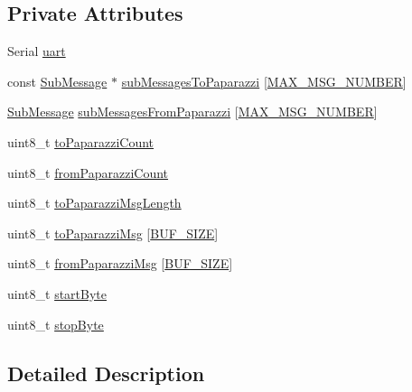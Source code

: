 \subsection*{Private Attributes}
\begin{DoxyCompactItemize}
\item 
Serial \hyperlink{class_u_a_r_t_messenger_aabc5283b509be4ce8335bbb2513e9b4c}{uart}
\item 
const \hyperlink{struct_sub_message}{Sub\+Message} $\ast$ \hyperlink{class_u_a_r_t_messenger_a1caaef4e6d8fa5005cd8ea5ff4937369}{sub\+Messages\+To\+Paparazzi} \mbox{[}\hyperlink{_u_a_r_t_messenger_8h_a6274d6c4801975be4baacd279386909d}{M\+A\+X\+\_\+\+M\+S\+G\+\_\+\+N\+U\+M\+B\+ER}\mbox{]}
\item 
\hyperlink{struct_sub_message}{Sub\+Message} \hyperlink{class_u_a_r_t_messenger_ad6fb0fea8b0262d46cc97f5d5b262a51}{sub\+Messages\+From\+Paparazzi} \mbox{[}\hyperlink{_u_a_r_t_messenger_8h_a6274d6c4801975be4baacd279386909d}{M\+A\+X\+\_\+\+M\+S\+G\+\_\+\+N\+U\+M\+B\+ER}\mbox{]}
\item 
uint8\+\_\+t \hyperlink{class_u_a_r_t_messenger_ae47f334cdd266ae4cde0715154f0ace3}{to\+Paparazzi\+Count}
\item 
uint8\+\_\+t \hyperlink{class_u_a_r_t_messenger_a72ecf1c51d6a28c582fff9fd454145dd}{from\+Paparazzi\+Count}
\item 
uint8\+\_\+t \hyperlink{class_u_a_r_t_messenger_ae2a77be89a1f84b466eab4753929b902}{to\+Paparazzi\+Msg\+Length}
\item 
uint8\+\_\+t \hyperlink{class_u_a_r_t_messenger_ad564c1e74510c03c7cb4ec5b7c57a802}{to\+Paparazzi\+Msg} \mbox{[}\hyperlink{_u_a_r_t_messenger_8h_a6821bafc3c88dfb2e433a095df9940c6}{B\+U\+F\+\_\+\+S\+I\+ZE}\mbox{]}
\item 
uint8\+\_\+t \hyperlink{class_u_a_r_t_messenger_a0cdc15059654a4231fcfe312612c73f3}{from\+Paparazzi\+Msg} \mbox{[}\hyperlink{_u_a_r_t_messenger_8h_a6821bafc3c88dfb2e433a095df9940c6}{B\+U\+F\+\_\+\+S\+I\+ZE}\mbox{]}
\item 
uint8\+\_\+t \hyperlink{class_u_a_r_t_messenger_abfc75506508a4d627236fc61f0f536b2}{start\+Byte}
\item 
uint8\+\_\+t \hyperlink{class_u_a_r_t_messenger_abd1f0ee480db317c51ea633fff5dd9af}{stop\+Byte}
\end{DoxyCompactItemize}


\subsection{Detailed Description}


